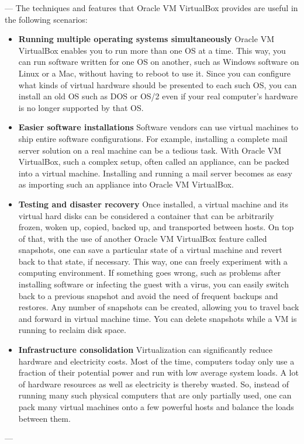 \documentclass[11pt]{article}
\begin{document}
\newpage
  ---
  The techniques and features that Oracle VM VirtualBox provides are useful
  in the following scenarios:

\begin{itemize}
\item \textbf{Running multiple operating systems simultaneously}
Oracle VM VirtualBox enables you to run more than one OS at a time. This way, you can run software written for one OS on another, such as Windows software on Linux or a Mac, without having to reboot to use it. Since you can configure what kinds of virtual hardware should be presented to each such OS, you can install an old OS such as DOS or OS/2 even if your real computer's hardware is no longer supported by that OS.
\item \textbf{Easier software installations} 
Software vendors can use virtual machines to ship entire software configurations. For example, installing a complete mail server solution on a real machine can be a tedious task. With Oracle VM VirtualBox, such a complex setup, often called an appliance, can be packed into a virtual machine. Installing and running a mail server becomes as easy as importing such an appliance into Oracle VM VirtualBox.
\item \textbf{Testing and disaster recovery} 
Once installed, a virtual machine and its virtual hard disks can be considered a container that can be arbitrarily frozen, woken up, copied, backed up, and transported between hosts.
On top of that, with the use of another Oracle VM VirtualBox feature called snapshots, one can save a particular state of a virtual machine and revert back to that state, if necessary. This way, one can freely experiment with a computing environment. If something goes wrong, such as problems after installing software or infecting the guest with a virus, you can easily switch back to a previous snapshot and avoid the need of frequent backups and restores.
Any number of snapshots can be created, allowing you to travel back and forward in virtual machine time. You can delete snapshots while a VM is running to reclaim disk space.
\item \textbf{Infrastructure consolidation}
Virtualization can significantly reduce hardware and electricity costs. Most of the time, computers today only use a fraction of their potential power and run with low average system loads. A lot of hardware resources as well as electricity is thereby wasted. So, instead of running many such physical computers that are only partially used, one can pack many virtual machines onto a few powerful hosts and balance the loads between them.
\end{itemize}
---
\newpage
\end{document}
